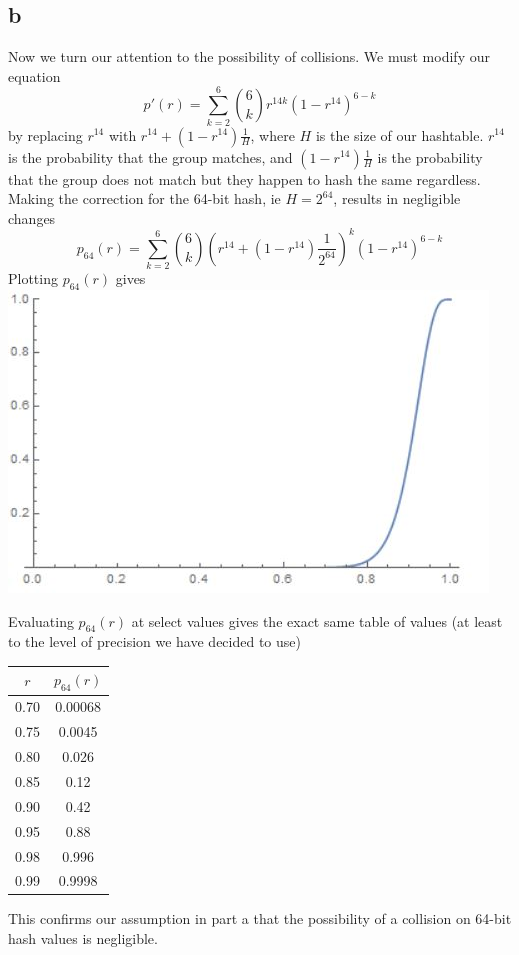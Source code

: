 \documentclass{article}
\begin{document}
\subsection*{b}
Now we turn our attention to the possibility of collisions. We must modify our equation
$$p'(r) = \sum\limits_{k=2}^6 {6 \choose k} r^{14k} (1-r^{14})^{6-k}$$
by replacing $r^14$ with $r^14 + (1-r^{14}) \frac{1}{H}$, where $H$ is the size of our hashtable. $r^14$ is the probability that the group matches, and $(1-r^{14}) \frac{1}{H}$ is the probability that the group does not match but they happen to hash the same regardless. Making the correction for the 64-bit hash, ie $H = 2^{64}$, results in negligible changes
$$p_{64}(r) = \sum\limits_{k=2}^6 {6 \choose k} (r^{14} + (1-r^{14}) \frac{1}{2^{64}})^k (1-r^{14})^{6-k}$$
Plotting $p_{64}(r)$ gives\\
\includegraphics[scale=0.8]{p64.jpg}

Evaluating $p_{64}(r)$ at select values gives the exact same table of values (at least to the level of precision we have decided to use)
\begin{center}
\begin{tabular}{ | c | c | }
\hline
$r$ & $p_{64}(r)$ \\
\hline\hline
0.70 & 0.00068 \\
\hline
0.75 & 0.0045\\
\hline
0.80 & 0.026\\
\hline
0.85 & 0.12\\
\hline
0.90 & 0.42\\
\hline
0.95 & 0.88\\
\hline
0.98 & 0.996 \\
\hline
0.99 & 0.9998 \\ 
\hline

\end{tabular}
\end{center}
This confirms our assumption in part a that the possibility of a collision on 64-bit hash values is negligible. 
\end{document}
